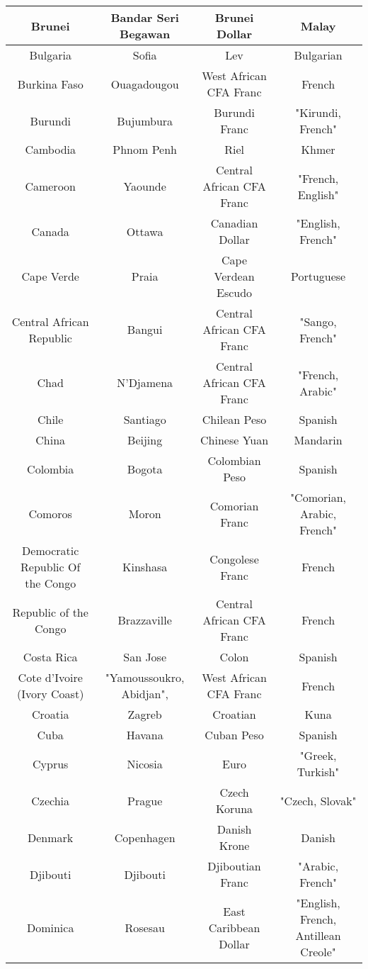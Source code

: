 \documentclass{article}
\begin{document}
\begin{center}
\begin{tabular}{||  c c c c  ||}
Brunei & Bandar Seri Begawan & Brunei Dollar & Malay   \\ \hline 
Bulgaria & Sofia & Lev & Bulgarian   \\ \hline 
Burkina Faso & Ouagadougou & West African CFA Franc & French   \\ \hline 
Burundi & Bujumbura & Burundi Franc & "Kirundi, French"   \\ \hline 
Cambodia & Phnom Penh & Riel & Khmer   \\ \hline 
Cameroon & Yaounde & Central African CFA Franc & "French, English"   \\ \hline 
Canada & Ottawa & Canadian Dollar & "English, French"   \\ \hline 
Cape Verde & Praia & Cape Verdean Escudo & Portuguese   \\ \hline 
Central African Republic & Bangui & Central African CFA Franc & "Sango, French"   \\ \hline 
Chad & N'Djamena & Central African CFA Franc & "French, Arabic"   \\ \hline 
Chile & Santiago & Chilean Peso & Spanish   \\ \hline 
China & Beijing & Chinese Yuan & Mandarin   \\ \hline 
Colombia & Bogota & Colombian Peso & Spanish   \\ \hline 
Comoros & Moron & Comorian Franc & "Comorian, Arabic, French"   \\ \hline 
Democratic Republic Of the Congo & Kinshasa & Congolese Franc & French   \\ \hline 
Republic of the Congo & Brazzaville & Central African CFA Franc & French   \\ \hline 
Costa Rica & San Jose & Colon & Spanish   \\ \hline 
Cote d'Ivoire (Ivory Coast) & "Yamoussoukro, Abidjan", & West African CFA Franc & French   \\ \hline 
Croatia & Zagreb & Croatian & Kuna   \\ \hline 
Cuba & Havana & Cuban Peso & Spanish   \\ \hline 
Cyprus & Nicosia & Euro & "Greek, Turkish"   \\ \hline 
Czechia & Prague & Czech Koruna & "Czech, Slovak"   \\ \hline 
Denmark & Copenhagen & Danish Krone & Danish   \\ \hline 
Djibouti & Djibouti & Djiboutian Franc & "Arabic, French"   \\ \hline 
Dominica & Rosesau & East Caribbean Dollar & "English, French, Antillean Creole"   \\ \hline 

\end{tabular}
\end{center}
\end{document}
